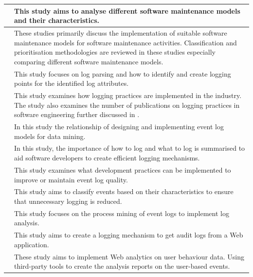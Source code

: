 \begin{xltabular}{\linewidth}{|l|X|}
	\hline \cite{Lenarduzzi2017} & This study aims to analyse different software maintenance models and their characteristics. \\

	\hline \cite{Ren2011,Vijayasarathy2016,Araujo2021} & These studies primarily discuss the implementation of suitable software maintenance models for software maintenance activities. Classification and prioritisation methodologies are reviewed in these studies especially \cite{Ren2011} comparing different software maintenance models. \\

	\hline \cite{Zhu2019} & This study focuses on log parsing and how to identify and create logging points for the identified log attributes. \\

	\hline \cite{Rong2018} & This study examines how logging practices are implemented in the industry. The study also examines the number of publications on logging practices in software engineering further discussed in . \\

	\hline \cite{Song2017} & In this study the relationship of designing and implementing event log models for data mining.  \\

	\hline \cite{Zhu2015} & In this study, the importance of how to log and what to log is summarised to aid software developers to create efficient logging mechanisms.  \\

	\hline \cite{Kherbouche2017} & This study examines what development practices can be implemented to improve or maintain event log quality.  \\

	\hline \cite{Fedaghi2010} & This study aims to classify events based on their characteristics to ensure that unnecessary logging is reduced.  \\

	\hline \cite{Jans2012} & This study focuses on the process mining of event logs to implement log analysis.  \\

	\hline \cite{Hasiloglu2018,Slaninova2014,Dhanalakshmi2016} & This study aims to create a logging mechanism to get audit logs from a Web application. \\

	\hline \cite{Kocsis2012,Waqar2017,Paliouras1999} & These study aims to implement Web analytics on user behaviour data. Using third-party tools to create the analysis reports on the user-based events.  \\
\end{xltabular}

